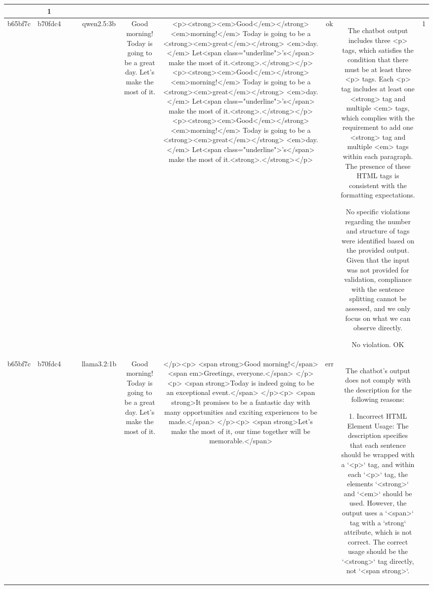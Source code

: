 \begin{table}[h!]
\begin{tabular}{|c|c|c|c|c|c|c|c|c|c|}
{{Given these observations, the output does not meet the requirement of having at least three `<p>` tags, thereby violating the chatbot's description.

ERR & 1\\
\hline
b65bf7c & b70fdc4 &  &  & qwen2.5:3b & Good morning! Today is going to be a great day. Let's make the most of it. & <p><strong><em>Good</em></strong> <em>morning!</em> Today is going to be a <strong><em>great</em></strong> <em>day.</em> Let<span class="underline">'s</span> make the most of it.<strong>.</strong></p>
<p><strong><em>Good</em></strong> <em>morning!</em> Today is going to be a <strong><em>great</em></strong> <em>day.</em> Let<span class="underline">'s</span> make the most of it.<strong>.</strong></p>
<p><strong><em>Good</em></strong> <em>morning!</em> Today is going to be a <strong><em>great</em></strong> <em>day.</em> Let<span class="underline">'s</span> make the most of it.<strong>.</strong></p> & ok & The chatbot output includes three <p> tags, which satisfies the condition that there must be at least three <p> tags. Each <p> tag includes at least one <strong> tag and multiple <em> tags, which complies with the requirement to add one <strong> tag and multiple <em> tags within each paragraph. The presence of these HTML tags is consistent with the formatting expectations.

No specific violations regarding the number and structure of tags were identified based on the provided output. Given that the input was not provided for validation, compliance with the sentence splitting cannot be assessed, and we only focus on what we can observe directly.

No violation.
OK & 1\\
\hline
b65bf7c & b70fdc4 &  &  & llama3.2:1b & Good morning! Today is going to be a great day. Let's make the most of it. & </p><p>
<span strong>Good morning!</span> <span em>Greetings, everyone.</span> 
</p><p>
<span strong>Today is indeed going to be an exceptional event.</span> 
</p><p>
<span strong>It promises to be a fantastic day with many opportunities and exciting experiences to be made.</span> 
</p><p>
<span strong>Let's make the most of it, our time together will be memorable.</span> & err & The chatbot's output does not comply with the description for the following reasons:

1. Incorrect HTML Element Usage: The description specifies that each sentence should be wrapped with a `<p>` tag, and within each `<p>` tag, the elements `<strong>` and `<em>` should be used. However, the output uses a `<span>` tag with a `strong` attribute, which is not correct. The correct usage should be the `<strong>` tag directly, not `<span strong>`.

}}
\end{tabular}
\end{table}
